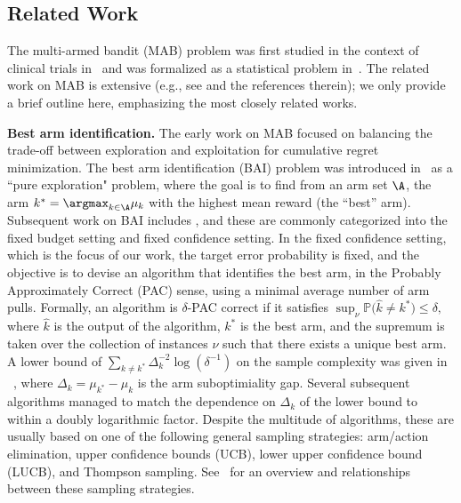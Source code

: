 \subsection{Related Work}
The multi-armed bandit (MAB) problem was first studied in the context of clinical trials in~\cite{thompson1933likelihood} and was formalized as a statistical problem in~\cite{Robbins1952SomeAO}. The related work on MAB is extensive (e.g., see \cite{slivkins2019introduction, Csa18} and the references therein); we only provide a brief outline here, emphasizing the most closely related works.

\textbf{Best arm identification.}
The early work on MAB focused on balancing the trade-off between exploration 
and exploitation
for cumulative regret minimization.
The best arm identification (BAI) problem was introduced in~\cite{EvenDar2002PACBF} as a ``pure exploration" problem, where the goal is to find from an arm set $\A$, the arm $k^* = \argmax_{k \in \A} \mu_k$ with the highest mean reward (the ``best'' arm).
Subsequent work on BAI includes \cite{bubeck2009pure, Audibert2010BestAI, gabillon2012unified, karnin2013almost, jamieson2014lil, kaufmann2016complexity, garivier2016optimal}, and these are commonly categorized into the
fixed budget setting and fixed confidence setting.
In the fixed confidence setting, which is the focus of our work, the target error probability is fixed, and the objective is to devise an algorithm that identifies the best arm, in the Probably Approximately Correct (PAC) sense, using a minimal average number of arm pulls.  
Formally, an algorithm is $\delta$-PAC correct if it satisfies 
$
    \sup_{\nu} \mathbb{P}\big(\hat{k} \ne k^* \big) \le \delta,
$ where $\hat{k}$ is the output of the algorithm, $k^*$ is the best arm, and the supremum is taken over the collection of instances $\nu$ such that there exists a unique best arm.
A lower bound of $\sum_{k \ne k^*} \Delta_k^{-2} \log(\delta^{-1})$ on the sample complexity was given in
~\cite{mannor2004sample}, where $\Delta_k = \mu_{k^*} - \mu_k$ is the arm suboptimiality gap.
Several subsequent algorithms managed to match the dependence on $\Delta_k$ of the lower bound to within a doubly logarithmic factor. 
Despite the multitude of algorithms, these are usually based on one of the following general sampling strategies: arm/action elimination, upper confidence bounds (UCB), lower upper confidence bound (LUCB), and Thompson sampling.  See~\cite{jamieson2014best} for an overview and relationships between these sampling strategies.


